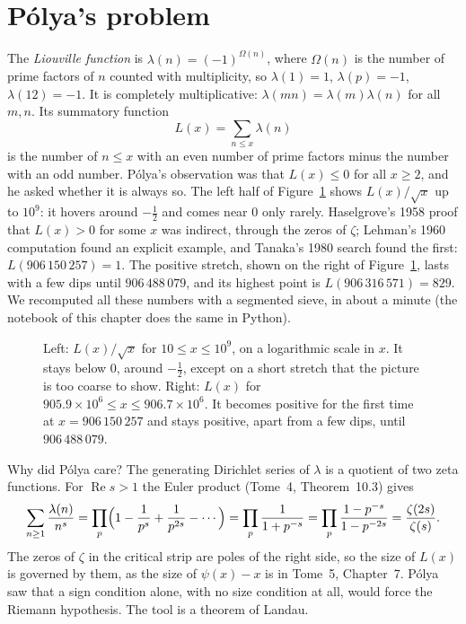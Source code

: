 \section{P\'olya's problem}

The \emph{Liouville function} is $\lambda(n)=(-1)^{\Omega(n)}$, where $\Omega(n)$ is the number of prime factors of $n$ counted with multiplicity, so
$\lambda(1)=1$, $\lambda(p)=-1$, $\lambda(12)=-1$. It is completely multiplicative: $\lambda(mn)=\lambda(m)\lambda(n)$ for all $m,n$. Its summatory function
\[
L(x)=\sum_{n\le x}\lambda(n)
\]
is the number of $n\le x$ with an even number of prime factors minus the number with an odd number. P\'olya's observation was that $L(x)\le0$ for all $x\ge2$, and
he asked whether it is always so. The left half of Figure~\ref{fig:liouville} shows $L(x)/\sqrt x$ up to $10^9$: it hovers around $-\frac12$ and comes near $0$
only rarely. Haselgrove's 1958 proof that $L(x)>0$ for some $x$ was indirect, through the zeros of $\zeta$; Lehman's 1960 computation found an explicit example,
and Tanaka's 1980 search found the first: $L(906\,150\,257)=1$. The positive stretch, shown on the right of Figure~\ref{fig:liouville}, lasts with a few dips
until $906\,488\,079$, and its highest point is $L(906\,316\,571)=829$. We recomputed all these numbers with a segmented sieve, in about a minute (the notebook
of this chapter does the same in Python).

\begin{figure}[ht]
\centering
{}
\caption{Left: $L(x)/\sqrt x$ for $10\le x\le10^9$, on a logarithmic scale in $x$. It stays below $0$, around $-\frac12$, except on a short stretch that the
picture is too coarse to show. Right: $L(x)$ for $905.9\times10^6\le x\le906.7\times10^6$. It becomes positive for the first time at $x=906\,150\,257$ and
stays positive, apart from a few dips, until $906\,488\,079$.}
\label{fig:liouville}
\end{figure}

Why did P\'olya care? The generating Dirichlet series of $\lambda$ is a quotient of two zeta functions. For $\operatorname{Re}s>1$ the Euler product
(Tome~4, Theorem~10.3) gives
\[
\sum_{n\ge1}\frac{\lambda(n)}{n^s}=\prod_p\Bigl(1-\frac1{p^s}+\frac1{p^{2s}}-\cdots\Bigr)=\prod_p\frac1{1+p^{-s}}=\prod_p\frac{1-p^{-s}}{1-p^{-2s}}=\frac{\zeta(2s)}{\zeta(s)}.
\]
The zeros of $\zeta$ in the critical strip are poles of the right side, so the size of $L(x)$ is governed by them, as the size of $\psi(x)-x$ is in Tome~5,
Chapter~7. P\'olya saw that a sign condition alone, with no size condition at all, would force the Riemann hypothesis. The tool is a theorem of Landau.

